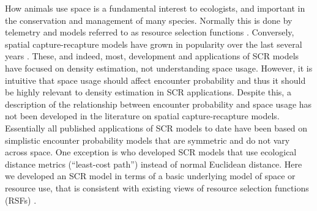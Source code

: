 \documentclass[12pt]{article}
\begin{document}
How animals use space is a fundamental interest to ecologists, and
important in the conservation and management of many species.
Normally this is done
by telemetry and models referred to as resource selection functions
\citep{manly_etal:2002}.  Conversely, spatial capture-recapture models
have grown in popularity over the last several years
\citep{efford:2004,borchers_efford:2008, royle:2008,
  efford_etal:2009ecol,royle_etal:2009ecol, gardner_etal:2010ecol,
  gardner_etal:2010jwm, kery_etal:2010,
  sollmann_etal:2011,mollet_etal:2012,gopalaswamy_etal:2012}. These,
and indeed, most,
 development and applications of SCR models have focused on density
estimation, not understanding space usage.  However, it is intuitive that space
usage should affect encounter probability and thus it should be highly relevant
to density estimation in SCR applications. Despite this, a description
of the
relationship between encounter
 probability and space usage has not
been developed in the literature on spatial
capture-recapture models.  Essentially all
published applications of SCR models to date have been based on
simplistic encounter
probability models that are symmetric
and do not vary across space. One exception is
\citet{royle_etal:2012ecol} who developed SCR models that use
ecological distance metrics (``least-cost path'')
instead of normal Euclidean distance. Here
we developed an SCR model in terms of a basic underlying model of
space or resource use, that is consistent with existing views of
resource selection functions (RSFs) \citep{manly_etal:2002}.
\end{document}
